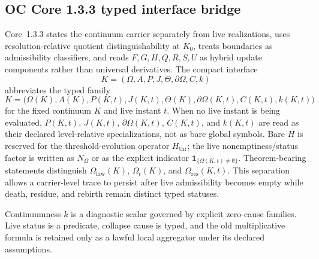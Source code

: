 
\subsection{OC Core 1.3.3 typed interface bridge}
\label{sec:oc133-model-scientific-closure-bridge}

Core~1.3.3 states the continuum carrier separately from live realizations,
uses resolution-relative quotient distinguishability at \(K_0\), treats
boundaries as admissibility classifiers, and reads \(F,G,H,Q,R,S,U\) as
hybrid update components rather than universal derivatives.  The compact
interface
\[
K=(\Omega,A,P,J,\Theta,\partial\Omega,C,k)
\]
abbreviates the typed family
\[
K=\big(\Omega(K),A(K),P(K,t),J(K,t),\Theta(K),
       \partial\Omega(K,t),C(K,t),k(K,t)\big)
\]
for the fixed continuum \(K\) and live instant \(t\).  When no live instant is
being evaluated, \(P(K,t)\), \(J(K,t)\), \(\partial\Omega(K,t)\), \(C(K,t)\),
and \(k(K,t)\) are read as their declared level-relative specializations, not
as bare global symbols.  Bare \(H\) is reserved for the threshold-evolution
operator \(H_{\mathrm{thr}}\); the live nonemptiness/status factor is written as
\(N_{\Omega}\) or as the explicit indicator
\(\mathbf{1}_{\{\Omega(K,t)\neq\emptyset\}}\).  Theorem-bearing statements distinguish
\(\Omega_{\mathrm{law}}(K)\), \(\Omega_t(K)\), and
\(\Omega_{\mathrm{res}}(K,t)\).  This separation allows a carrier-level trace
to persist after live admissibility becomes empty while death, residue, and
rebirth remain distinct typed statuses.

Continuumness \(k\) is a diagnostic scalar governed by explicit zero-cause
families.  Live status is a predicate, collapse cause is typed, and the old
multiplicative formula is retained only as a lawful local aggregator under its
declared assumptions.
